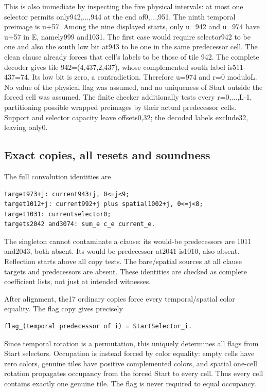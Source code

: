 This is also immediate by inspecting the five physical intervals: at most one selector permits only942,...,944 at the end of0,...,951. The ninth temporal preimage is u+57. Among the nine displayed starts, only u=942 and u=974 have u+57 in E, namely999 and1031. The first case would require selector942 to be one and also the south low bit at943 to be one in the same predecessor cell. The clean clause already forces that cell's labels to be those of tile 942. The complete decoder gives tile 942=(4,437,2,437), whose complemented south label is511-437=74. Its low bit is zero, a contradiction. Therefore u=974 and r=0 moduloL. No value of the physical flag was assumed, and no uniqueness of Start outside the forced cell was assumed. The finite checker additionally tests every r=0,...,L-1, partitioning possible wrapped preimages by their actual predecessor cells. Support and selector capacity leave offsets0,32; the decoded labels exclude32, leaving only0.

\subsection{Exact copies, all resets and soundness}
The full convolution identities are

\begin{Verbatim}[fontsize=\small,breaklines=true,breakanywhere=true,breaksymbolleft={}]
target973+j: current943+j, 0<=j<9;
target1012+j: current992+j plus spatial1002+j, 0<=j<8;
target1031: currentselector0;
targets2042 and3074: sum_e c_e current_e.
\end{Verbatim}

The singleton cannot contaminate a clause: its would-be predecessors are 1011 and2043, both absent. Its would-be predecessor at2041 is1010, also absent. Reflection starts above all copy tests. The bare/spatial sources at all clause targets and predecessors are absent. These identities are checked as complete coefficient lists, not just at intended witnesses.

After alignment, the17 ordinary copies force every temporal/spatial color equality. The flag copy gives precisely

\begin{Verbatim}[fontsize=\small,breaklines=true,breakanywhere=true,breaksymbolleft={}]
flag_(temporal predecessor of i) = StartSelector_i.
\end{Verbatim}

Since temporal rotation is a permutation, this uniquely determines all flags from Start selectors. Occupation is instead forced by color equality: empty cells have zero colors, genuine tiles have positive complemented colors, and spatial one-cell rotation propagates occupancy from the forced Start to every cell. Thus every cell contains exactly one genuine tile. The flag is never required to equal occupancy.

